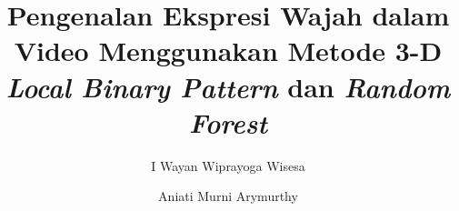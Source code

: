 \documentclass[review,3p,12pt,times]{elsarticle}
\begin{document}
\begin{frontmatter}



\title{Pengenalan Ekspresi Wajah dalam Video Menggunakan Metode 3-D \textit{Local Binary Pattern} dan \textit{Random Forest}}


\author[csui]{I Wayan Wiprayoga Wisesa}
\author[csui]{Aniati Murni Arymurthy}


\address[csui]{Program Studi Magister Ilmu Komputer, Fakultas Ilmu Komputer, Universitas Indonesia\\
Depok, West Java, Indonesia}


\end{frontmatter}
\end{document}
